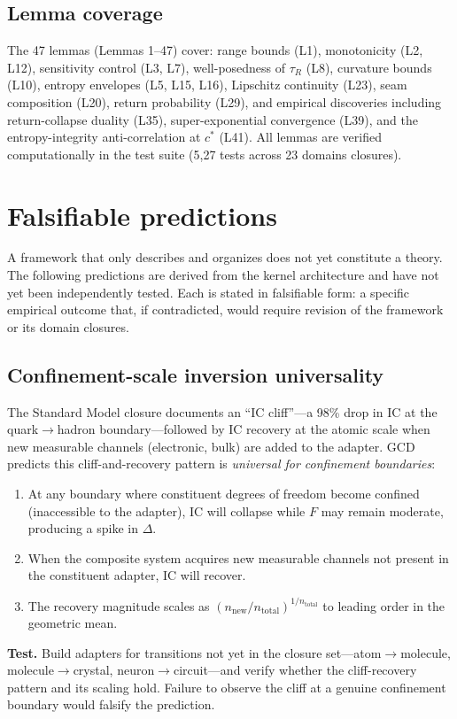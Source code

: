 \documentclass[
  aps,
  prd,
  preprint,
  superscriptaddress,
  nofootinbib,
  floatfix
]{revtex4-2}
\newcommand{\IC}{\mathrm{IC}}
\begin{document}
\subsection{Lemma coverage}
The 47 lemmas (Lemmas 1--47) cover: range bounds (L1), monotonicity (L2, L12), sensitivity control (L3, L7),
well-posedness of $\tau_R$ (L8), curvature bounds (L10), entropy envelopes (L5, L15, L16), Lipschitz continuity (L23),
seam composition (L20), return probability (L29), and empirical discoveries including return-collapse duality (L35),
super-exponential convergence (L39), and the entropy-integrity anti-correlation at $c^*$ (L41).
All lemmas are verified computationally in the test suite (5{,}27 tests across 23 domains closures).

\section{Falsifiable predictions}
\label{sec:predictions}

A framework that only describes and organizes does not yet constitute a theory.
The following predictions are derived from the kernel architecture and have not yet been independently tested.
Each is stated in falsifiable form: a specific empirical outcome that, if contradicted, would require revision
of the framework or its domain closures.

\subsection{Confinement-scale inversion universality}
\label{pred:confinement}

The Standard Model closure documents an ``IC cliff''---a
98\% drop in $\IC$ at the quark$\to$hadron boundary---followed
by $\IC$ recovery at the atomic scale when new measurable
channels (electronic, bulk) are added to the adapter.
GCD predicts this cliff-and-recovery pattern is
\emph{universal for confinement boundaries}:
\begin{enumerate}[leftmargin=2.2em]
  \item At any boundary where constituent degrees of freedom become confined (inaccessible to the adapter),
  $\IC$ will collapse while $F$ may remain moderate, producing a spike in $\Delta$.
  \item When the composite system acquires new measurable channels not present in the constituent adapter,
  $\IC$ will recover.
  \item The recovery magnitude scales as $(n_{\mathrm{new}}/n_{\mathrm{total}})^{1/n_{\mathrm{total}}}$
  to leading order in the geometric mean.
\end{enumerate}
\textbf{Test.} Build adapters for transitions not yet
in the closure set---atom${\to}$molecule,
molecule${\to}$crystal,
neuron${\to}$circuit---and
verify whether the cliff-recovery pattern and
its scaling hold.
Failure to observe the cliff at a genuine confinement
boundary would falsify the prediction.
\end{document}
